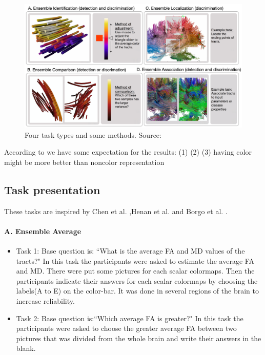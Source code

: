 \documentclass[a4paper, 12pt]{report}
\begin{document}
\begin{figure}[ht]
    \centering
    \includegraphics[width = 0.9\columnwidth]{task-types}
    \caption{Four task types and some methods. Source:  \cite{chen}}
    \label{fig:task-types}
\end{figure}

According to \cite{chen} we have some expectation for the results: (1)
(2) 
(3) having color might be more better than noncolor representation

\subsection{Task presentation}
These tasks are inspired by Chen et al. \cite{chen} ,Henan et al. \cite{henan} and Borgo et al. \cite{borgo}.

\paragraph{A. Ensemble Average}

\begin{itemize}
	\item{Task 1:} Base question is: ``What is the average FA and MD values of the tracts?"
	In this task the participants were asked to estimate the average FA and MD. There were put some pictures for each scalar colormaps. Then the participants indicate their answers for each scalar colormaps by choosing the labels(A to E) on the color-bar. It was done in several regions of the brain to increase reliability. 
	
	
	\item{Task 2:} Base question is:``Which average FA is greater?"
	In this task the participants were asked to choose the greater average FA between two pictures that was divided from the whole brain and write their answers in the blank. 
	
\end{itemize}
\end{document}
